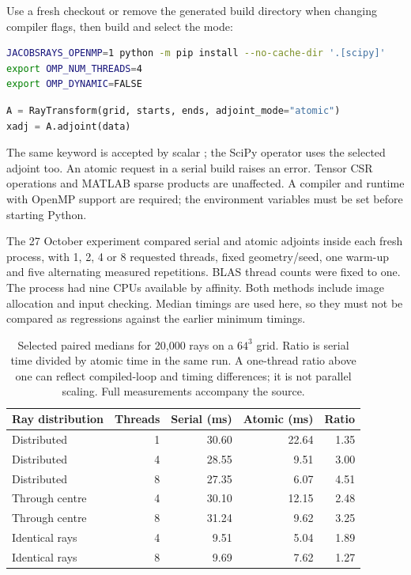 \documentclass[11pt,a4paper]{article}
\newcommand{\code}[1]{\texttt{\detokenize{#1}}}
\begin{document}
Use a fresh checkout or remove the generated build
directory when changing compiler flags, then build and select the mode:
\par\noindent\begin{minipage}{\linewidth}
\begin{lstlisting}[language=bash]
JACOBSRAYS_OPENMP=1 python -m pip install --no-cache-dir '.[scipy]'
export OMP_NUM_THREADS=4
export OMP_DYNAMIC=FALSE
\end{lstlisting}
\end{minipage}\par
\par\noindent\begin{minipage}{\linewidth}
\begin{lstlisting}[language=Python]
A = RayTransform(grid, starts, ends, adjoint_mode="atomic")
xadj = A.adjoint(data)
\end{lstlisting}
\end{minipage}\par
The same keyword is accepted by scalar \code{JacobProjector}; the SciPy
operator uses the selected adjoint too. An atomic request in a serial
build raises an error. Tensor CSR operations and MATLAB sparse products
are unaffected. A compiler and runtime with OpenMP support are required;
the environment variables must be set before starting Python.

The 27 October experiment compared serial and atomic adjoints inside each
fresh process, with 1, 2, 4 or 8 requested threads, fixed geometry/seed,
one warm-up and five alternating measured repetitions. BLAS thread counts
were fixed to one. The process had nine CPUs available by affinity. Both
methods include image allocation and input checking. Median timings are
used here, so they must not be compared as regressions against the earlier
minimum timings.
\begin{table}[htbp]
\centering\small
\begin{tabular}{@{}lrrrr@{}}
\toprule
Ray distribution & Threads & Serial (ms) & Atomic (ms) & Ratio \\
\midrule
Distributed & 1 & 30.60 & 22.64 & 1.35 \\
Distributed & 4 & 28.55 & 9.51 & 3.00 \\
Distributed & 8 & 27.35 & 6.07 & 4.51 \\
Through centre & 4 & 30.10 & 12.15 & 2.48 \\
Through centre & 8 & 31.24 & 9.62 & 3.25 \\
Identical rays & 4 & 9.51 & 5.04 & 1.89 \\
Identical rays & 8 & 9.69 & 7.62 & 1.27 \\
\bottomrule
\end{tabular}
\caption{Selected paired medians for 20,000 rays on a $64^3$ grid.
Ratio is serial time divided by atomic time in the same run. A one-thread
ratio above one can reflect compiled-loop and timing differences; it is
not parallel scaling. Full measurements accompany the source.}
\end{table}
\end{document}
